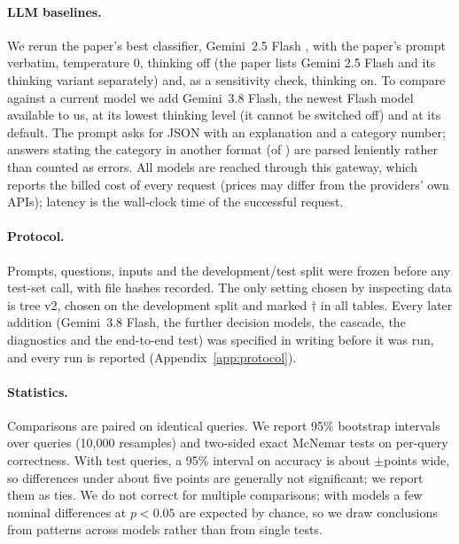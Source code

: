 \paragraph{LLM baselines.} We rerun the paper's best classifier, Gemini~2.5 Flash \citep{comanici2025gemini}, with the paper's prompt
verbatim, temperature 0, thinking off (the paper lists Gemini 2.5 Flash and its thinking variant separately) and,
as a sensitivity check, thinking on. To compare against a current model we add Gemini~3.8 Flash, the newest Flash
model available to us, at its lowest thinking level (it cannot be switched off) and at its default. The prompt asks
for JSON with an explanation and a category number; answers stating the category in another format (\nlenient of
\ngemini) are parsed leniently rather than counted as errors. All models are reached through this gateway, which reports the billed cost of every request (prices may
differ from the providers' own APIs); latency is the wall-clock time of the successful request.

\paragraph{Protocol.} Prompts, questions, inputs and the development/test split were frozen before any test-set
call, with file hashes recorded. The only setting chosen by inspecting data is tree v2, chosen on the development
split and marked $\dagger$ in all tables. Every later addition (Gemini~3.8 Flash, the further decision models, the
cascade, the diagnostics and the end-to-end test) was specified in writing before it was run, and every run is reported
(Appendix~\ref{app:protocol}).

\paragraph{Statistics.} Comparisons are paired on identical queries. We report 95\% bootstrap intervals over queries
\citep{efron1994bootstrap} (10,000 resamples) and two-sided exact McNemar tests \citep{mcnemar1947} on per-query
correctness. With \ntest test queries, a 95\% interval on accuracy is about $\pm$\cihalf points wide, so differences
under about five points are generally not significant; we report them as ties. We do not correct for multiple
comparisons; with \ndm models a few nominal differences at $p<0.05$ are expected by chance, so we draw conclusions
from patterns across models rather than from single tests.
